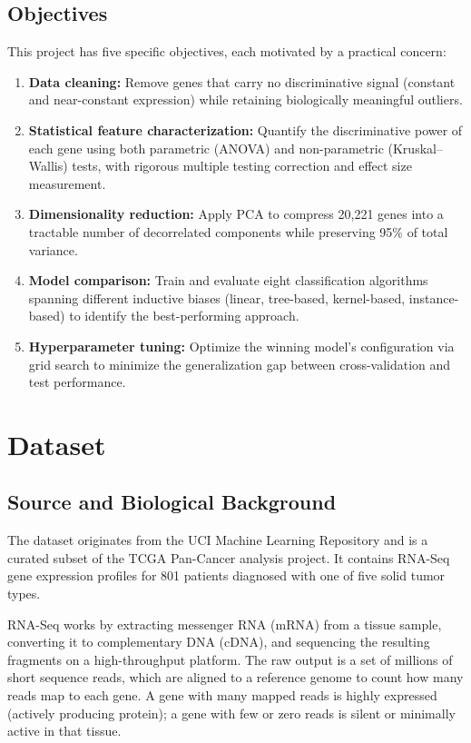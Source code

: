 \documentclass{article}
\begin{document}
\subsection{Objectives}
This project has five specific objectives, each motivated by a practical concern:
\begin{enumerate}[leftmargin=2em]
\item \textbf{Data cleaning:} Remove genes that carry no discriminative signal (constant and near-constant expression) while retaining biologically meaningful outliers.
\item \textbf{Statistical feature characterization:} Quantify the discriminative power of each gene using both parametric (ANOVA) and non-parametric (Kruskal--Wallis) tests, with rigorous multiple testing correction and effect size measurement.
\item \textbf{Dimensionality reduction:} Apply PCA to compress 20{,}221 genes into a tractable number of decorrelated components while preserving 95\% of total variance.
\item \textbf{Model comparison:} Train and evaluate eight classification algorithms spanning different inductive biases (linear, tree-based, kernel-based, instance-based) to identify the best-performing approach.
\item \textbf{Hyperparameter tuning:} Optimize the winning model's configuration via grid search to minimize the generalization gap between cross-validation and test performance.
\end{enumerate}


\section{Dataset}

\subsection{Source and Biological Background}
The dataset originates from the UCI Machine Learning Repository \citep{uci_rnaseq} and is a curated subset of the TCGA Pan-Cancer analysis project. It contains RNA-Seq gene expression profiles for 801 patients diagnosed with one of five solid tumor types.

RNA-Seq works by extracting messenger RNA (mRNA) from a tissue sample, converting it to complementary DNA (cDNA), and sequencing the resulting fragments on a high-throughput platform. The raw output is a set of millions of short sequence reads, which are aligned to a reference genome to count how many reads map to each gene. A gene with many mapped reads is highly expressed (actively producing protein); a gene with few or zero reads is silent or minimally active in that tissue.
\end{document}
